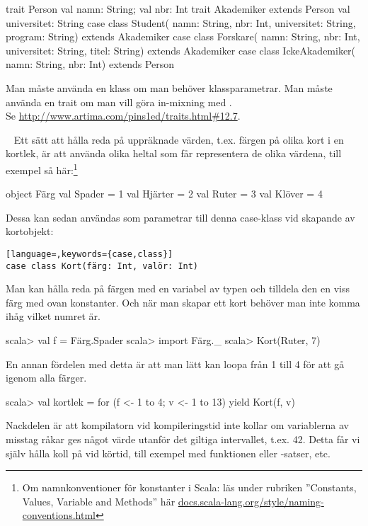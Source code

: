 \SubtaskSolved
\begin{Code}
trait Person {val namn: String; val nbr: Int}
trait Akademiker extends Person {val universitet: String}
case class Student(
  namn: String,
  nbr: Int,
  universitet: String,
  program: String) extends Akademiker
case class Forskare(
  namn: String,
  nbr: Int,
  universitet: String,
  titel: String) extends Akademiker
case class IckeAkademiker(
    namn: String,
    nbr: Int) extends Person
\end{Code}

\SubtaskSolved  Man måste använda en klass om man behöver klassparametrar. Man måste använda en trait om man vill göra in-mixning med . \\
 Se \href{http://www.artima.com/pins1ed/traits.html\#12.7}{http://www.artima.com/pins1ed/traits.html\#12.7}.


\QUESTEND









\QUESTBEGIN

\Task  \what~  Ett sätt att hålla reda på uppräknade värden, t.ex. färgen på olika kort i en kortlek, är att använda olika heltal som får representera de olika värdena, till exempel så här:\footnote{Om namnkonventioner för konstanter i Scala: läs under rubriken ''Constants, Values, Variable and Methods'' här \href{http://docs.scala-lang.org/style/naming-conventions.html}{docs.scala-lang.org/style/naming-conventions.html}}
\begin{Code}
object Färg {
  val Spader = 1
  val Hjärter = 2
  val Ruter = 3
  val Klöver = 4
}
\end{Code}
Dessa kan sedan användas som parametrar till denna case-klass vid skapande av kortobjekt:
\begin{lstlisting}[language=,keywords={case,class}]
case class Kort(färg: Int, valör: Int)
\end{lstlisting}
Man kan hålla reda på färgen med en variabel av typen  och tilldela den en viss färg med ovan konstanter. Och när man skapar ett kort behöver man inte komma ihåg vilket numret är.
\begin{REPL}
scala> val f = Färg.Spader
scala> import Färg._
scala> Kort(Ruter, 7)
\end{REPL}
En annan fördelen med detta är att man lätt kan loopa från 1 till 4 för att gå igenom alla färger.
\begin{REPL}
scala> val kortlek = for (f <- 1 to 4; v <- 1 to 13) yield Kort(f, v)
\end{REPL}
Nackdelen är att kompilatorn vid kompileringstid inte kollar om variablerna av misstag råkar ges något värde utanför det giltiga intervallet, t.ex. 42. Detta får vi själv hålla koll på vid körtid, till exempel med funktionen  eller -satser, etc.

